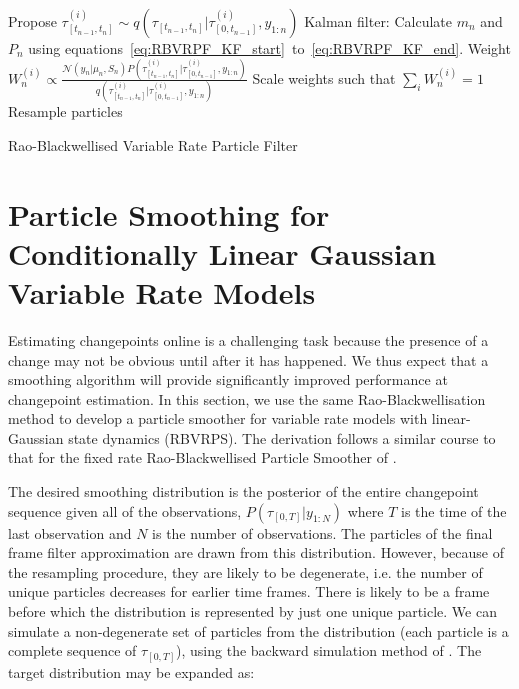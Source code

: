\documentclass[a4paper,10pt]{article}
\begin{document}
\begin{algorithm}
 \begin{algorithmic}
      \STATE Propose $\tau_{[t_{n-1},t_n]}^{(i)} \sim q(\tau_{[t_{n-1},t_n]}|\tau_{[0,t_{n-1}]}^{(i)}, y_{1:n})$
      \STATE Kalman filter: Calculate $m_n$ and $P_n$ using equations~\ref{eq:RBVRPF_KF_start}~to~\ref{eq:RBVRPF_KF_end}.
      \STATE Weight $W_n^{(i)} \propto \frac{\mathcal{N}(y_n|\mu_n, S_n) P(\tau_{[t_{n-1},t_n]}^{(i)}|\tau_{[0,t_{n-1}]}^{(i)}, y_{1:n})}{q(\tau_{[t_{n-1},t_n]}^{(i)}|\tau_{[0,t_{n-1}]}^{(i)}, y_{1:n})}$
    \ENDFOR
    \STATE Scale weights such that $\sum_i W_n^{(i)}=1$
    \STATE Resample particles
  \ENDFOR
 \end{algorithmic}
\label{alg:RBVRPF}
\caption{Rao-Blackwellised Variable Rate Particle Filter}
\end{algorithm}




\section{Particle Smoothing for Conditionally Linear Gaussian Variable Rate Models}

Estimating changepoints online is a challenging task because the presence of a change may not be obvious until after it has happened. We thus expect that a smoothing algorithm will provide significantly improved performance at changepoint estimation. In this section, we use the same Rao-Blackwellisation method to develop a particle smoother for variable rate models with linear-Gaussian state dynamics (RBVRPS). The derivation follows a similar course to that for the fixed rate Rao-Blackwellised Particle Smoother of \cite{Sarkka2012}.

The desired smoothing distribution is the posterior of the entire changepoint sequence given all of the observations, $P(\tau_{[0,T]}|y_{1:N})$ where $T$ is the time of the last observation and $N$ is the number of observations. The particles of the final frame filter approximation are drawn from this distribution. However, because of the resampling procedure, they are likely to be degenerate, i.e. the number of unique particles decreases for earlier time frames. There is likely to be a frame before which the distribution is represented by just one unique particle. We can simulate a non-degenerate set of particles from the distribution (each particle is a complete sequence of $\tau_{[0,T]}$), using the backward simulation method of \cite{Godsill2004,Sarkka2012}. The target distribution may be expanded as:
\end{document}
